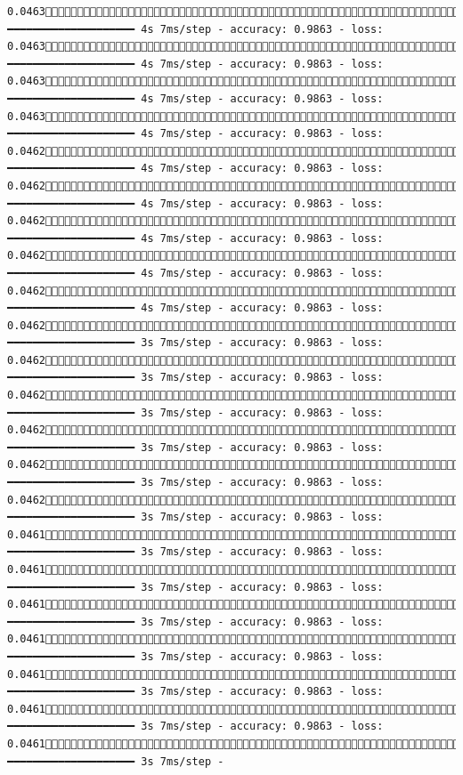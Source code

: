 \documentclass[
  letterpaper,
  DIV=11,
  numbers=noendperiod]{scrreprt}
\begin{document}
\begin{verbatim}
0.04631272/1875 ━━━━━━━━━━━━━━━━━━━━ 4s 7ms/step - accuracy: 0.9863 - loss: 0.04631279/1875 ━━━━━━━━━━━━━━━━━━━━ 4s 7ms/step - accuracy: 0.9863 - loss: 0.04631287/1875 ━━━━━━━━━━━━━━━━━━━━ 4s 7ms/step - accuracy: 0.9863 - loss: 0.04631295/1875 ━━━━━━━━━━━━━━━━━━━━ 4s 7ms/step - accuracy: 0.9863 - loss: 0.04621303/1875 ━━━━━━━━━━━━━━━━━━━━ 4s 7ms/step - accuracy: 0.9863 - loss: 0.04621310/1875 ━━━━━━━━━━━━━━━━━━━━ 4s 7ms/step - accuracy: 0.9863 - loss: 0.04621317/1875 ━━━━━━━━━━━━━━━━━━━━ 4s 7ms/step - accuracy: 0.9863 - loss: 0.04621324/1875 ━━━━━━━━━━━━━━━━━━━━ 4s 7ms/step - accuracy: 0.9863 - loss: 0.04621332/1875 ━━━━━━━━━━━━━━━━━━━━ 4s 7ms/step - accuracy: 0.9863 - loss: 0.04621339/1875 ━━━━━━━━━━━━━━━━━━━━ 3s 7ms/step - accuracy: 0.9863 - loss: 0.04621347/1875 ━━━━━━━━━━━━━━━━━━━━ 3s 7ms/step - accuracy: 0.9863 - loss: 0.04621354/1875 ━━━━━━━━━━━━━━━━━━━━ 3s 7ms/step - accuracy: 0.9863 - loss: 0.04621361/1875 ━━━━━━━━━━━━━━━━━━━━ 3s 7ms/step - accuracy: 0.9863 - loss: 0.04621368/1875 ━━━━━━━━━━━━━━━━━━━━ 3s 7ms/step - accuracy: 0.9863 - loss: 0.04621375/1875 ━━━━━━━━━━━━━━━━━━━━ 3s 7ms/step - accuracy: 0.9863 - loss: 0.04611382/1875 ━━━━━━━━━━━━━━━━━━━━ 3s 7ms/step - accuracy: 0.9863 - loss: 0.04611390/1875 ━━━━━━━━━━━━━━━━━━━━ 3s 7ms/step - accuracy: 0.9863 - loss: 0.04611398/1875 ━━━━━━━━━━━━━━━━━━━━ 3s 7ms/step - accuracy: 0.9863 - loss: 0.04611405/1875 ━━━━━━━━━━━━━━━━━━━━ 3s 7ms/step - accuracy: 0.9863 - loss: 0.04611412/1875 ━━━━━━━━━━━━━━━━━━━━ 3s 7ms/step - accuracy: 0.9863 - loss: 0.04611420/1875 ━━━━━━━━━━━━━━━━━━━━ 3s 7ms/step - accuracy: 0.9863 - loss: 0.04611426/1875 ━━━━━━━━━━━━━━━━━━━━ 3s 7ms/step - 
\end{verbatim}
\end{document}
